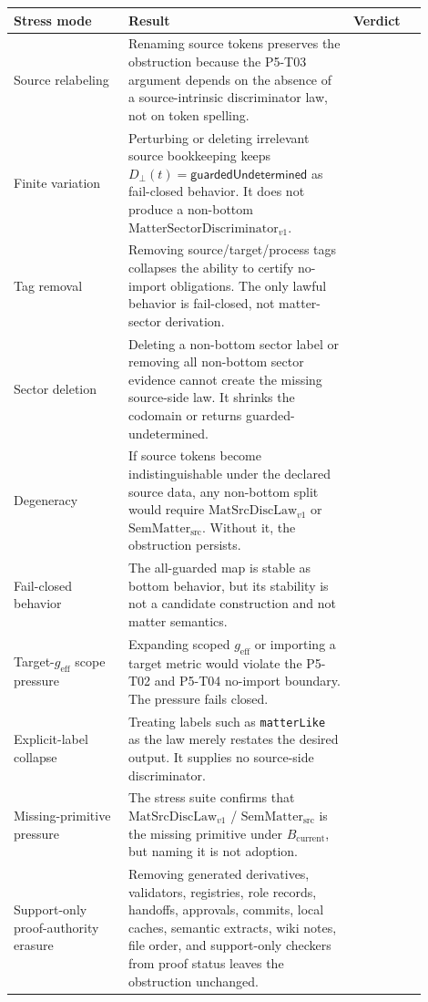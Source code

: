 \documentclass[11pt]{article}
\newcommand{\geff}{g_{\mathrm{eff}}}
\newcommand{\MatSrcDiscLaw}{\mathrm{MatSrcDiscLaw}_{v1}}
\newcommand{\SemMatterSrc}{\mathrm{SemMatter}_{\mathrm{src}}}
\newcommand{\MatterDisc}{\mathrm{MatterSectorDiscriminator}_{v1}}
\newcommand{\Bcur}{B_{\mathrm{current}}}
\newcommand{\Dbot}{D_{\bot}}
\newcommand{\Guarded}{\mathsf{guardedUndetermined}}
\newcommand{\StressPass}{\mathrm{STRESS\mbox{-}PASS}}
\begin{document}
\begin{longtable}{p{0.25\linewidth}p{0.49\linewidth}p{0.16\linewidth}}
\toprule
Stress mode & Result & Verdict \\
\midrule
Source relabeling & Renaming source tokens preserves the obstruction because
the P5-T03 argument depends on the absence of a source-intrinsic discriminator
law, not on token spelling. & \StressPass \\
Finite variation & Perturbing or deleting irrelevant source bookkeeping keeps
\(\Dbot(t)=\Guarded\) as fail-closed behavior. It does not produce a
non-bottom \(\MatterDisc\). & \StressPass \\
Tag removal & Removing source/target/process tags collapses the ability to
certify no-import obligations. The only lawful behavior is fail-closed, not
matter-sector derivation. & \StressPass \\
Sector deletion & Deleting a non-bottom sector label or removing all
non-bottom sector evidence cannot create the missing source-side law. It
shrinks the codomain or returns guarded-undetermined. & \StressPass \\
Degeneracy & If source tokens become indistinguishable under the declared
source data, any non-bottom split would require \(\MatSrcDiscLaw\) or
\(\SemMatterSrc\). Without it, the obstruction persists. & \StressPass \\
Fail-closed behavior & The all-guarded map is stable as bottom behavior, but
its stability is not a candidate construction and not matter semantics. &
\StressPass \\
Target-\(\geff\) scope pressure & Expanding scoped \(\geff\) or importing a
target metric would violate the P5-T02 and P5-T04 no-import boundary. The
pressure fails closed. & \StressPass \\
Explicit-label collapse & Treating labels such as
\texttt{matterLike} as the law merely restates the desired output. It supplies
no source-side discriminator. & \StressPass \\
Missing-primitive pressure & The stress suite confirms that
\(\MatSrcDiscLaw\) / \(\SemMatterSrc\) is the missing primitive under
\(\Bcur\), but naming it is not adoption. & \StressPass \\
Support-only proof-authority erasure & Removing generated derivatives,
validators, registries, role records, handoffs, approvals, commits, local
caches, semantic extracts, wiki notes, file order, and support-only checkers
from proof status leaves the obstruction unchanged. & \StressPass \\
\bottomrule
\end{longtable}
\end{document}
